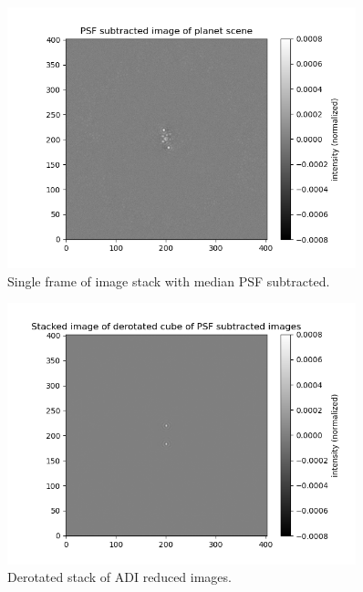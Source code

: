 \begin{figure}[!ht]
  \centering
  \includegraphics[width=0.9\textwidth]{./figures/adi_meansub.png}
  \caption{Single frame of image stack with median PSF subtracted.}
  \label{fig:adi_3}
\end{figure}

\begin{figure}[!ht]
  \centering
  \includegraphics[width=0.9\textwidth]{./figures/adi_derotstack.png}
  \caption{Derotated stack of ADI reduced images.}
  \label{fig:adi_4}
\end{figure}

